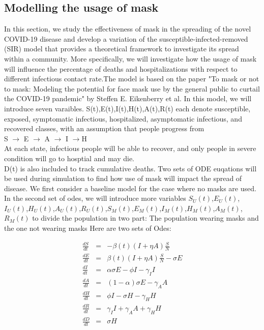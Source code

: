 \documentclass{article}
\begin{document}
\subsection{Modelling the usage of mask}
In this section, we study the effectiveness of mask in the spreading of the novel COVID-19 disease and develop a variation of the susceptible-infected-removed (SIR) model that provides a theoretical framework to investigate its spread within a community. More specifically, we will investigate how the usage of mask will influence the percentage of deaths and hospitalizations with respect to different infectious contact rate.The model is based on the paper "To mask or not to mask: Modeling the potential for face mask use by the general public to curtail the COVID-19 pandemic" by Steffen E. Eikenberry et al. In this model, we will introduce seven varaibles. S(t),E(t),I(t),H(t),A(t),R(t) each denote susceptible, exposed, symptomatic infectious, hospitalized, asymptomatic infectious, and recovered classes, with an assumption that people progress from \\
S $\rightarrow$ E $\rightarrow$ A $\rightarrow$ I $\rightarrow$H \\ At each state, infectious people will be able to recover, and only people in severe condition will go to hosptial and may die.\\D(t) is also included to track cumulative deaths. Two sets of ODE euqations will be used during simulation to find how use of mask will impact the spread of disease. We first consider a baseline model for the case where no masks are used. In the second set of odes, we will introduce more variables
$S_{U}(t)$,$E_{U}(t)$,$I_{U}(t)$,$H_{U}(t)$,$A_{U}(t)$,$R_{U}(t)$,$S_{M}(t)$,$E_{M}(t)$,$I_{M}(t)$,$H_{M}(t)$,$A_{M}(t)$,$R_{M}(t)$ to divide the population in two part: The population wearing masks and the one not wearing masks
Here are two sets of Odes:\\
\begin{minipage}{0.45\textwidth}
\begin{eqnarray}
  \frac{dS}{dt} &=& -\beta{(t)}(I+\eta A)\frac{S}{N}\nonumber\\
  \frac{dE}{dt} &=& \beta(t)(I+\eta A)\frac{S}{N}-\sigma{E}\nonumber\\
  \frac{dI}{dt} &=& \alpha\sigma{E}-\phi{I}-\gamma_{I}I\nonumber\\
  \frac{dA}{dt} &=& (1-\alpha)\sigma E-\gamma_{A}A\nonumber\\
  \frac{dH}{dt} &=& \phi I - \sigma H - \gamma_{H}H\nonumber\\
  \frac{dR}{dt} &=& \gamma_{I}{I} + \gamma_{A}{A}+\gamma_{H}{H}\nonumber\\
  \frac{dD}{dt} &=& \sigma H\nonumber\\
\end{eqnarray}
\end{minipage}
\end{document}
